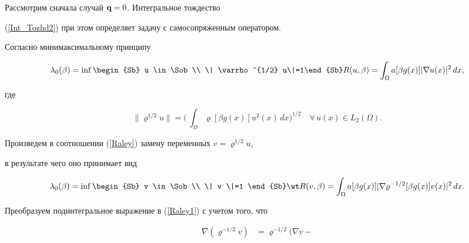 \begin{pf} 


Рассмотрим сначала случай ${\bold q} =0$. Интегральное тождество 


(\ref{Int_Tozhd2}) при этом определяет задачу с самосопряженным оператором. 


 Согласно ми\-ни\-мак\-си\-маль\-но\-му принципу \cite{Kurant}


\begin{equation} \label{Raley}


\lambda _0(\beta)= \inf\begin{Sb} u \in\Sob \\ \| \varrho^{1/2} u\|=1\end{Sb} 


R(u,\beta )=\int_\Omega a [ \beta g(x) ] | \nabla u(x) |^2\, dx,


\end{equation}


где 


$$


\| \varrho^{1/2} u\|= \bigg(\, \int_\Omega \varrho [ \beta g(x) 


] u^2 (x) \, dx\bigg)^{1/2}\quad


\forall \,u (x) \in L_2(\Omega).


$$


Произведем в соотношении (\ref{Raley}) замену переменных $v= \varrho^{1/2}u$, 


в результате чего оно принимает вид 


\begin{equation} \label{Raley1}


\lambda _0(\beta)= \inf\begin{Sb} v \in\Sob \\ \| v \|=1 \end{Sb}


\wt R(v,\beta )=\int_\Omega a [ \beta g(x) ] 


| \nabla \varrho^{-1/2}[ \beta g(x) ] v(x)|^2 \, dx.


\end{equation}


Преобразуем подинтегральное выражение в (\ref{Raley1}) с учетом того, что 


\begin{equation}


\begin{split}


\label{N1}


\nabla (\varrho^{-1/2}v )& = \varrho^{-1/2}\bigg(\nabla v - 



\end{split}
\end{equation}
\end{pf}
